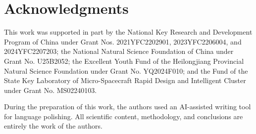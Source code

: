 \documentclass[journal]{new-aiaa}
\begin{document}
\newpage

\section*{Acknowledgments}

This work was supported in part by the National Key Research and Development Program of China under Grant Nos. 2021YFC2202901, 2023YFC2206004, and 2024YFC2207203; the National Natural Science Foundation of China under Grant No. U25B2052; the Excellent Youth Fund of the Heilongjiang Provincial Natural Science Foundation under Grant No. YQ2024F010; and the Fund of the State Key Laboratory of Micro-Spacecraft Rapid Design and Intelligent Cluster under Grant No. MS02240103.

During the preparation of this work, the authors used an AI-assisted writing tool for language polishing. All scientific content, methodology, and conclusions are entirely the work of the authors.


\end{document}
